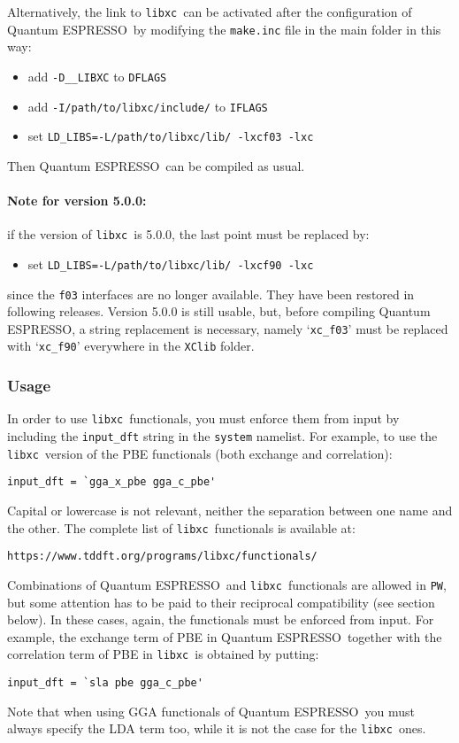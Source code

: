 \documentclass[12pt,a4paper]{article}
\def\qe{{\sc Quantum ESPRESSO}}
\def\libxc{\texttt{libxc}}
\begin{document}
Alternatively, the link to \libxc\ can be activated after the configuration of  \qe\ by modifying the \texttt{make.inc} file in the main folder in this way:
\begin{itemize}
	\item add \texttt{-D\_\_LIBXC} to \texttt{DFLAGS}
	\item add \texttt{-I/path/to/libxc/include/} to \texttt{IFLAGS}
	\item set \texttt{LD\_LIBS=-L/path/to/libxc/lib/ -lxcf03 -lxc}
\end{itemize}
Then \qe\ can be compiled as usual.

\paragraph{Note for version 5.0.0:} if the version of \libxc\ is 5.0.0, the last point must be replaced by:
\begin{itemize}
	\item set \texttt{LD\_LIBS=-L/path/to/libxc/lib/ -lxcf90 -lxc}
\end{itemize}
since the \texttt{f03} interfaces are no longer available. They have been restored in following releases. Version 5.0.0 is still usable, but, before compiling \qe, a string replacement is necessary, namely `\texttt{xc\_f03}' must be replaced with `\texttt{xc\_f90}' everywhere in the \texttt{XClib} folder.

\subsubsection{Usage}
In order to use \libxc\ functionals, you must enforce them from input by including the \texttt{input\_dft} string in the \texttt{system} namelist. For example, to use the \libxc\ version of the PBE functionals (both exchange and correlation):
\begin{verbatim}
input_dft = `gga_x_pbe gga_c_pbe'
\end{verbatim}
%
Capital or lowercase is not relevant, neither the separation between one name and the other. The complete list of \libxc\ functionals is available at:
\begin{verbatim}
https://www.tddft.org/programs/libxc/functionals/
\end{verbatim}
%
Combinations of \qe\ and \libxc\ functionals are allowed in \texttt{PW}, but some attention has to be paid to their reciprocal compatibility (see section below). In these cases, again, the functionals must be enforced from input. For example, the exchange term of PBE in \qe\ together with the correlation term of PBE in \libxc\ is obtained by putting:
\begin{verbatim}
input_dft = `sla pbe gga_c_pbe'
\end{verbatim}
Note that when using GGA functionals of \qe\ you must always specify the LDA term too, while it is not the case for the \libxc\ ones.
%
\end{document}
